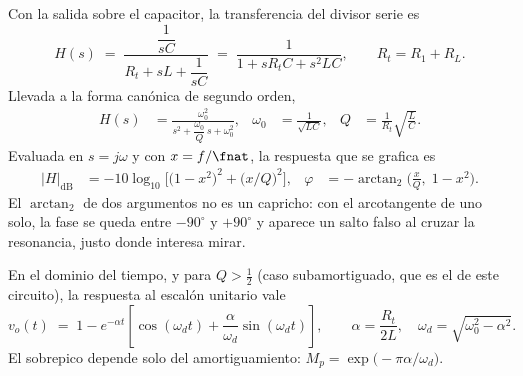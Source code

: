 Con la salida sobre el capacitor, la transferencia del divisor serie es
%
\begin{equation}
  H(s) \;=\; \frac{\dfrac{1}{sC}}{R_t + sL + \dfrac{1}{sC}}
        \;=\; \frac{1}{1 + sR_tC + s^{2}LC},
  \qquad R_t = R_1 + R_L .
  \label{eq:transferencia}
\end{equation}
%
Llevada a la forma canónica de segundo orden,
%
\begin{align}
  H(s)   &= \frac{\omega_0^{2}}{s^{2} + \dfrac{\omega_0}{Q}\,s + \omega_0^{2}}, &
  \omega_0 &= \frac{1}{\sqrt{LC}}, &
  Q &= \frac{1}{R_t}\sqrt{\frac{L}{C}} .
  \label{eq:canonica}
\end{align}
%
Evaluada en $s = j\omega$ y con $x = f/\fnat$, la respuesta que se grafica es
%
\begin{align}
  |H|_{\mathrm{dB}} &= -10\log_{10}\!\Big[\big(1-x^{2}\big)^{2} + \big(x/Q\big)^{2}\Big], &
  \varphi &= -\arctan_2\!\Big(\frac{x}{Q},\; 1-x^{2}\Big).
  \label{eq:modulo-fase}
\end{align}
%
El $\arctan_2$ de dos argumentos no es un capricho: con el arcotangente de uno
solo, la fase se queda entre $-90^\circ$ y $+90^\circ$ y aparece un salto falso
al cruzar la resonancia, justo donde interesa mirar.

En el dominio del tiempo, y para $Q > \tfrac{1}{2}$ (caso subamortiguado, que es
el de este circuito), la respuesta al escalón unitario vale
%
\begin{equation}
  v_o(t) \;=\; 1 - e^{-\alpha t}\!\left[\cos(\omega_d t) + \frac{\alpha}{\omega_d}\sin(\omega_d t)\right],
  \qquad
  \alpha = \frac{R_t}{2L}, \quad
  \omega_d = \sqrt{\omega_0^{2}-\alpha^{2}} .
  \label{eq:escalon}
\end{equation}
%
El sobrepico depende solo del amortiguamiento:
$M_p = \exp\!\big(-\pi\alpha/\omega_d\big)$.
